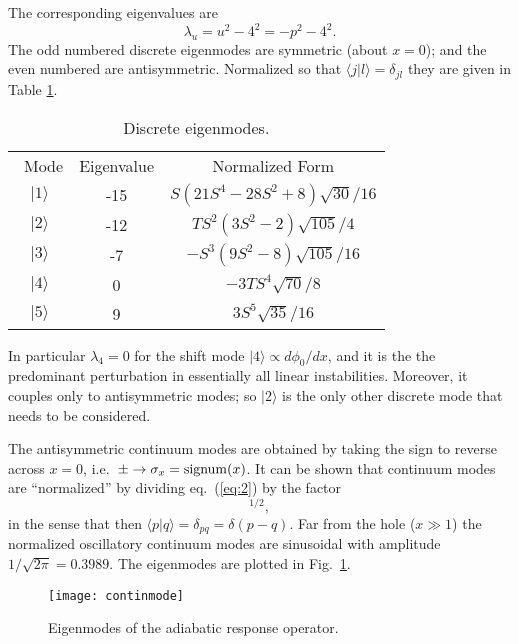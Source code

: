 \documentclass[12pt]{article}
\def\ket#1{|#1\rangle}
\def\bra#1{\langle#1}
\begin{document}
The corresponding eigenvalues are
\begin{equation}
  \label{eq:3}
  \lambda_u= u^2-4^2=-p^2-4^2.
\end{equation}
The odd numbered discrete eigenmodes are symmetric (about $x=0$); and
the even numbered are antisymmetric. Normalized so that
$\bra{j}\ket{l}=\delta_{jl}$ they are given in Table \ref{discrete}. 
\begin{table}[ht]
  \center
\begin{tabular}{ccc}\
  Mode & Eigenvalue & Normalized Form\\
  $\ket{1}$& -15&$S(21S^4 - 28S^2 + 8)\sqrt{30}/16$\\
  $\ket{2}$& -12&$TS^2(3S^2 - 2)\sqrt{105}/4$\\
  $\ket{3}$& -7 &$-S^3(9S^2 - 8)\sqrt{105}/16 $\\
  $\ket{4}$&  0 &$-3TS^4\sqrt{70}/8 $\\
  $\ket{5}$&  9 &$3S^5\sqrt{35}/16 $\\
\end{tabular}
\caption{Discrete eigenmodes.\label{discrete}}
\end{table}
\noindent
In particular $\lambda_4=0$ for the shift mode
$\ket{4}\propto d\phi_0/dx$, and it is the the predominant
perturbation in essentially all linear instabilities. Moreover, it
couples only to antisymmetric modes; so $\ket{2}$ is the only other
discrete mode that needs to be considered.

The antisymmetric continuum modes are obtained by taking the sign to
reverse across $x=0$, i.e.\ $\pm\to \sigma_x={\rm signum}(x)$.  It can
be shown that continuum modes are ``normalized'' by dividing eq.\
(\ref{eq:2}) by the factor
\begin{equation}
  [2\pi(p^2+1^2)(p^2+2^2)(p^2+3^2)(p^2+4^2)(p^2+5^2)]^{1/2}, 
  \label{eq:4}
\end{equation}
in the sense that then $\bra{p}\ket{q}=\delta_{pq}=\delta(p-q)$. Far
from the hole ($x\gg1$) the normalized oscillatory continuum modes are
sinusoidal with amplitude $1/\sqrt{2\pi}=0.3989$. The eigenmodes are
plotted in Fig.\ \ref{modeplots}.
\begin{figure}\center
  \texttt{[image: continmode]}
\caption{Eigenmodes of the adiabatic response operator.\label{modeplots}}
\end{figure}
\end{document}
